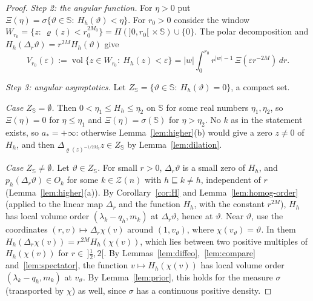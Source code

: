 \documentclass[11pt,a4paper]{article}
\theoremstyle{definition}
\theoremstyle{remark}
\numberwithin{equation}{section}
\newcommand{\vol}{\operatorname{vol}}
\newcommand{\abs}[1]{\lvert #1\rvert}
\newcommand{\eps}{\varepsilon}
\newcommand{\Zb}{\mathcal Z}
\begin{document}
\begin{proof}
\emph{Step 2: the angular function.} For $\eta>0$ put $\Xi(\eta)=\sigma\{\vartheta\in\mathbb S:\ H_h(\vartheta)<\eta\}$. For $r_0>0$ consider the window $W_{r_0}=\{z:\ \varrho(z)<r_0^{2M_0}\}=\Pi(]0,r_0[\,\times\mathbb S)\cup\{0\}$. The polar decomposition and $H_h(\Delta_r\vartheta)=r^{2M}H_h(\vartheta)$ give
\begin{equation}\label{eq:polar}
V_{r_0}(\eps):=\vol\{z\in W_{r_0}:\ H_h(z)<\eps\}=\abs w\int_0^{r_0}r^{\abs w-1}\,\Xi(\eps r^{-2M})\,dr .
\end{equation}

\emph{Step 3: angular asymptotics.} Let $Z_{\mathbb S}=\{\vartheta\in\mathbb S:\ H_h(\vartheta)=0\}$, a compact set.

\emph{Case $Z_{\mathbb S}=\emptyset$.} Then $0<\eta_1\le H_h\le\eta_2$ on $\mathbb S$ for some real numbers $\eta_1,\eta_2$, so $\Xi(\eta)=0$ for $\eta\le\eta_1$ and $\Xi(\eta)=\sigma(\mathbb S)$ for $\eta>\eta_2$. No $k$ as in the statement exists, so $a_*=+\infty$: otherwise Lemma~\ref{lem:higher}(b) would give a zero $z\neq0$ of $H_h$, and then $\Delta_{\varrho(z)^{-1/2M_0}}z\in Z_{\mathbb S}$ by Lemma~\ref{lem:dilation}.

\emph{Case $Z_{\mathbb S}\neq\emptyset$.} Let $\vartheta\in Z_{\mathbb S}$. For small $r>0$, $\Delta_r\vartheta$ is a small zero of $H_h$, and $p_h(\Delta_r\vartheta)\in O_k$ for some $k\in\Zb(n)$ with $h\sqsubseteq k\neq h$, independent of $r$ (Lemma~\ref{lem:higher}(a)). By Corollary~\ref{cor:H} and Lemma~\ref{lem:homog-order} (applied to the linear map $\Delta_r$ and the function $H_h$, with the constant $r^{2M}$), $H_h$ has local volume order $(\lambda_k-q_h,m_k)$ at $\Delta_r\vartheta$, hence at $\vartheta$. Near $\vartheta$, use the coordinates $(r,v)\mapsto\Delta_r\chi(v)$ around $(1,v_\vartheta)$, where $\chi(v_\vartheta)=\vartheta$. In them $H_h(\Delta_r\chi(v))=r^{2M}H_h(\chi(v))$, which lies between two positive multiples of $H_h(\chi(v))$ for $r\in\,]\frac{1}{2},2[$. By Lemmas~\ref{lem:diffeo},~\ref{lem:compare} and~\ref{lem:spectator}, the function $v\mapsto H_h(\chi(v))$ has local volume order $(\lambda_k-q_h,m_k)$ at $v_\vartheta$. By Lemma~\ref{lem:prior}, this holds for the measure $\sigma$ (transported by $\chi$) as well, since $\sigma$ has a continuous positive density.


\end{proof}
\end{document}
